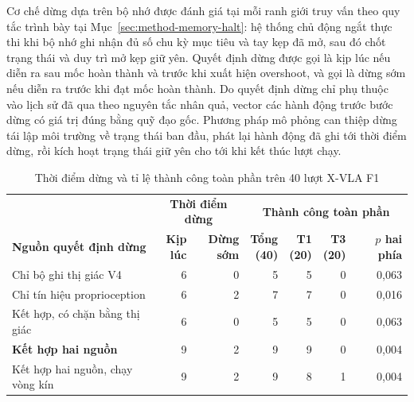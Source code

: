 \label{sec:halt-timing}
\label{sec:halt-forks}
Cơ chế dừng dựa trên bộ nhớ được đánh giá tại mỗi ranh giới truy vấn theo quy tắc trình bày tại Mục~\ref{sec:method-memory-halt}: hệ thống chủ động ngắt thực thi khi bộ nhớ ghi nhận đủ số chu kỳ mục tiêu và tay kẹp đã mở, sau đó chốt trạng thái và duy trì mở kẹp giữ yên. Quyết định dừng được gọi là kịp lúc nếu diễn ra sau mốc hoàn thành và trước khi xuất hiện overshoot, và gọi là dừng sớm nếu diễn ra trước khi đạt mốc hoàn thành. Do quyết định dừng chỉ phụ thuộc vào lịch sử đã qua theo nguyên tắc nhân quả, vector các hành động trước bước dừng có giá trị đúng bằng quỹ đạo gốc. Phương pháp mô phỏng can thiệp dừng tái lập môi trường về trạng thái ban đầu, phát lại hành động đã ghi tới thời điểm dừng, rồi kích hoạt trạng thái giữ yên cho tới khi kết thúc lượt chạy.

\begin{table}[htbp]
\centering\small
\caption{Thời điểm dừng và tỉ lệ thành công toàn phần trên 40 lượt X-VLA F1}
\label{tab:halt-combined}
\label{tab:halt-timing-combined}
\label{tab:halt-forks-combined}
\setlength{\tabcolsep}{3pt}
\begin{tabular}{>{\raggedright\arraybackslash}p{}|r|r|r|r|r|r}
\toprule
& \multicolumn{2}{c|}{\textbf{Thời điểm dừng}} & \multicolumn{4}{c}{\textbf{Thành công toàn phần}} \\
\cmidrule(lr){2-3}\cmidrule(lr){4-7}
\textbf{Nguồn quyết định dừng} & \shortstack{\textbf{Kịp}\\\textbf{lúc}} & \shortstack{\textbf{Dừng}\\\textbf{sớm}} & \shortstack{\textbf{Tổng}\\\textbf{(40)}} & \shortstack{\textbf{T1}\\\textbf{(20)}} & \shortstack{\textbf{T3}\\\textbf{(20)}} & \shortstack{\textbf{$p$ hai}\\\textbf{phía}} \\
\midrule
Chỉ bộ ghi thị giác V4 & 6 & 0 & 5 & 5 & 0 & 0,063 \\
Chỉ tín hiệu proprioception & 6 & 2 & 7 & 7 & 0 & 0,016 \\
Kết hợp, có chặn bằng thị giác & 6 & 0 & 5 & 5 & 0 & 0,063 \\
\textbf{Kết hợp hai nguồn} & 9 & 2 & 9 & 9 & 0 & 0,004 \\
\midrule
Kết hợp hai nguồn, chạy vòng kín & 9 & 2 & 9 & 8 & 1 & 0,004 \\
\bottomrule
\end{tabular}
\par\smallskip
\end{table}

